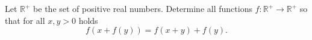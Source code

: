 Let $\mathbb{R}^+$ be the set of positive real numbers.
Determine all functions $f\colon\mathbb{R}^+ \rightarrow \mathbb{R}^+$ so that
for all $x,y>0$ holds
$$f(x+f(y))=f(x+y)+f(y).$$
